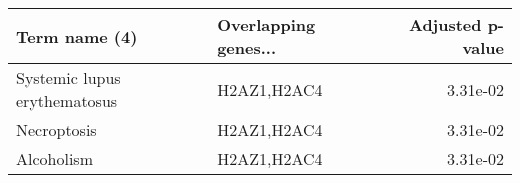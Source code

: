 \begin{tabular}{llr}
\toprule
               Term name (4) & Overlapping genes... &  Adjusted p-value \\
\midrule
Systemic lupus erythematosus &          H2AZ1,H2AC4 &          3.31e-02 \\
                 Necroptosis &          H2AZ1,H2AC4 &          3.31e-02 \\
                  Alcoholism &          H2AZ1,H2AC4 &          3.31e-02 \\
\bottomrule
\end{tabular}
